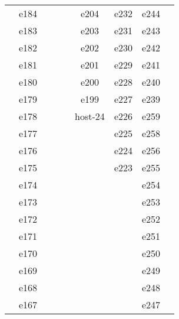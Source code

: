 \documentclass[10pt,letterpaper]{article}
\begin{document}
\begin{center}
\begin{tabular}{ |c|c|c|c|c|c|c|c|c| }
        & e184 &         &                  &            & e204    & e232     & e244           &            \\
        & e183 &         &                  &            & e203    & e231     & e243           &            \\
        & e182 &         &                  &            & e202    & e230     & e242           &            \\
        & e181 &         &                  &            & e201    & e229     & e241           &            \\
        & e180 &         &                  &            & e200    & e228     & e240           &            \\
        & e179 &         &                  &            & e199    & e227     & e239           &            \\
        & e178 &         &                  &            & host-24 & e226     & e259           &            \\
        & e177 &         &                  &            &         & e225     & e258           &            \\
        & e176 &         &                  &            &         & e224     & e256           &            \\
        & e175 &         &                  &            &         & e223     & e255           &            \\
        & e174 &         &                  &            &         &          & e254           &            \\
        & e173 &         &                  &            &         &          & e253           &            \\
        & e172 &         &                  &            &         &          & e252           &            \\
        & e171 &         &                  &            &         &          & e251           &            \\
        & e170 &         &                  &            &         &          & e250           &            \\
        & e169 &         &                  &            &         &          & e249           &            \\
        & e168 &         &                  &            &         &          & e248           &            \\
        & e167 &         &                  &            &         &          & e247           &            \\

\end{tabular}
\end{center}
\end{document}
